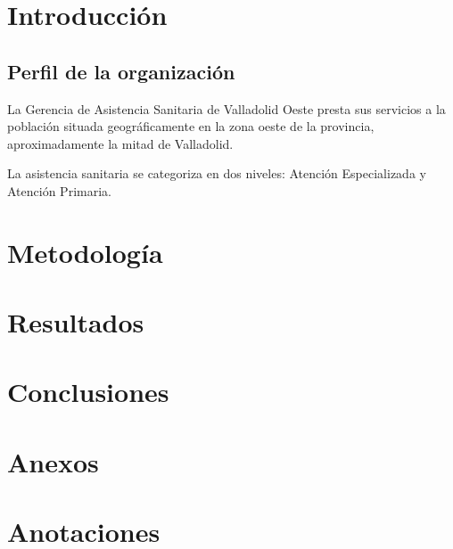 \documentclass[12pt, a4paper]{report}
\begin{document}
\tableofcontents

\chapter{Introducción}

\section{Perfil de la organización}
La Gerencia de Asistencia Sanitaria de Valladolid Oeste presta sus servicios a la población situada geográficamente en la zona oeste de la provincia, aproximadamente la mitad de Valladolid.

La asistencia sanitaria se categoriza en dos niveles: Atención Especializada y Atención Primaria.

\chapter{Metodología}
\chapter{Resultados}
\chapter{Conclusiones}

\appendix
\chapter{Anexos}

\chapter{Anotaciones}
\end{document}
